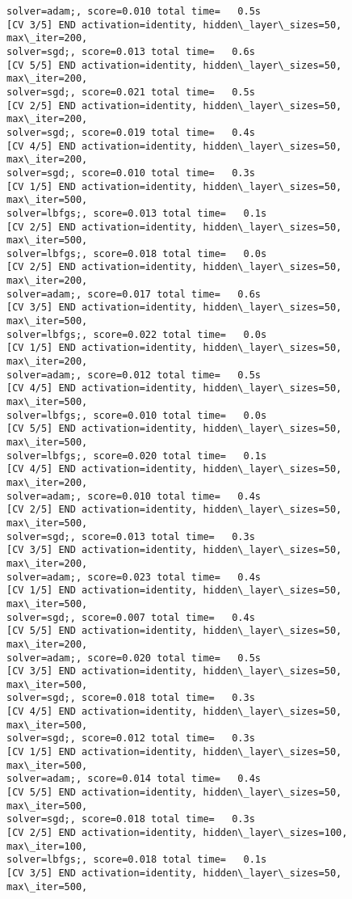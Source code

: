 \documentclass[11pt]{article}
\begin{document}
\begin{Verbatim}[commandchars=\\\{\}]
solver=adam;, score=0.010 total time=   0.5s
[CV 3/5] END activation=identity, hidden\_layer\_sizes=50, max\_iter=200,
solver=sgd;, score=0.013 total time=   0.6s
[CV 5/5] END activation=identity, hidden\_layer\_sizes=50, max\_iter=200,
solver=sgd;, score=0.021 total time=   0.5s
[CV 2/5] END activation=identity, hidden\_layer\_sizes=50, max\_iter=200,
solver=sgd;, score=0.019 total time=   0.4s
[CV 4/5] END activation=identity, hidden\_layer\_sizes=50, max\_iter=200,
solver=sgd;, score=0.010 total time=   0.3s
[CV 1/5] END activation=identity, hidden\_layer\_sizes=50, max\_iter=500,
solver=lbfgs;, score=0.013 total time=   0.1s
[CV 2/5] END activation=identity, hidden\_layer\_sizes=50, max\_iter=500,
solver=lbfgs;, score=0.018 total time=   0.0s
[CV 2/5] END activation=identity, hidden\_layer\_sizes=50, max\_iter=200,
solver=adam;, score=0.017 total time=   0.6s
[CV 3/5] END activation=identity, hidden\_layer\_sizes=50, max\_iter=500,
solver=lbfgs;, score=0.022 total time=   0.0s
[CV 1/5] END activation=identity, hidden\_layer\_sizes=50, max\_iter=200,
solver=adam;, score=0.012 total time=   0.5s
[CV 4/5] END activation=identity, hidden\_layer\_sizes=50, max\_iter=500,
solver=lbfgs;, score=0.010 total time=   0.0s
[CV 5/5] END activation=identity, hidden\_layer\_sizes=50, max\_iter=500,
solver=lbfgs;, score=0.020 total time=   0.1s
[CV 4/5] END activation=identity, hidden\_layer\_sizes=50, max\_iter=200,
solver=adam;, score=0.010 total time=   0.4s
[CV 2/5] END activation=identity, hidden\_layer\_sizes=50, max\_iter=500,
solver=sgd;, score=0.013 total time=   0.3s
[CV 3/5] END activation=identity, hidden\_layer\_sizes=50, max\_iter=200,
solver=adam;, score=0.023 total time=   0.4s
[CV 1/5] END activation=identity, hidden\_layer\_sizes=50, max\_iter=500,
solver=sgd;, score=0.007 total time=   0.4s
[CV 5/5] END activation=identity, hidden\_layer\_sizes=50, max\_iter=200,
solver=adam;, score=0.020 total time=   0.5s
[CV 3/5] END activation=identity, hidden\_layer\_sizes=50, max\_iter=500,
solver=sgd;, score=0.018 total time=   0.3s
[CV 4/5] END activation=identity, hidden\_layer\_sizes=50, max\_iter=500,
solver=sgd;, score=0.012 total time=   0.3s
[CV 1/5] END activation=identity, hidden\_layer\_sizes=50, max\_iter=500,
solver=adam;, score=0.014 total time=   0.4s
[CV 5/5] END activation=identity, hidden\_layer\_sizes=50, max\_iter=500,
solver=sgd;, score=0.018 total time=   0.3s
[CV 2/5] END activation=identity, hidden\_layer\_sizes=100, max\_iter=100,
solver=lbfgs;, score=0.018 total time=   0.1s
[CV 3/5] END activation=identity, hidden\_layer\_sizes=50, max\_iter=500,

\end{Verbatim}
\end{document}
